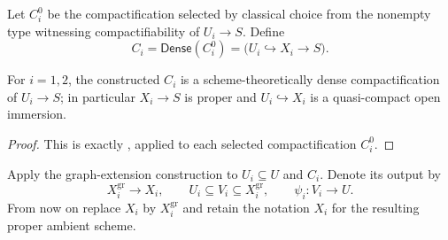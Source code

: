 \begin{definition}
  \label{def:nagata-two-open-dense-compactifications}
  \leanok

  Let $C_i^0$ be the compactification selected by classical choice from the
  nonempty type witnessing compactifiability of $U_i\to S$.  Define
  \[
    C_i=\mathsf{Dense}(C_i^0)
      =\bigl(U_i\hookrightarrow X_i\longrightarrow S\bigr).
  \]
\end{definition}

\begin{lemma}
  \label{lemma:nagata-two-open-dense-compactifications}
  \leanok

  For $i=1,2$, the constructed $C_i$ is a scheme-theoretically dense
  compactification of $U_i\to S$; in particular $X_i\to S$ is proper and
  $U_i\hookrightarrow X_i$ is a quasi-compact open immersion.
\end{lemma}

\begin{proof}
  \leanok
  This is exactly , applied to each selected
  compactification $C_i^0$.
\end{proof}

\begin{definition}
  \label{def:nagata-two-open-graph-extensions}
  \leanok

  Apply the graph-extension construction to
  $U_i\subseteq U$ and $C_i$.  Denote its output by
  \[
    X_i^{\mathrm{gr}}\longrightarrow X_i,\qquad
    U_i\subseteq V_i\subseteq X_i^{\mathrm{gr}},\qquad
    \psi_i\colon V_i\longrightarrow U.
  \]
  From now on replace $X_i$ by $X_i^{\mathrm{gr}}$ and retain the notation
  $X_i$ for the resulting proper ambient scheme.
\end{definition}

